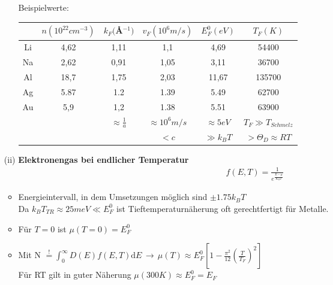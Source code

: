 \begin{itemize}
\begin{itemize}
         Beispielwerte:
         \begin{table}[H]
             \centering
             \begin{tabular}{c|ccccc}
                 & $ n (10^{22}cm^{-3}) $ & $k_F ($\AA$^{-1})$ & $v_F (10^6 m/s)$ & $E_F^0 (eV)$ & $T_F (K)$  \\ \hline
            Li  & 4,62 & 1,11 & 1,1  & 4,69  & 54400 \\
            Na  &2,62   &0,91   &1,05   &3,11   &36700\\
            Al  &18,7   &1,75   &2,03   &11,67  &135700\\
            Ag  &5.87   &1.2    &1.39   &5.49   &62700 \\
            Au  &5,9    &1,2    &  1.38  &   5.51    &  63900    \\
                &       &$\approx \frac{1}{a}$  & $\approx 10^6 m/s$    & $\approx 5 eV $   & $T_F \gg T_{Schmelz} $ \\
                &       &                       & $< c$                 & $\gg k_BT$         & $> \Theta_D \approx RT $
            \end{tabular}
         \end{table}
    \end{itemize}
    \item[(ii)] \textbf{Elektronengas bei endlicher Temperatur}
    \begin{align}
        f(E,T) = \frac{1}{e^{\frac{E-\mu}{K_B T}}}
    \end{align} 
    \begin{itemize}
        \item Energieintervall, in dem Umsetzungen möglich sind $\pm 1.75 k_B T$\\
            Da $k_B T_{TR} \approx 25 meV \ll E_F^0 $ ist Tieftemperaturnäherung oft gerechtfertigt für Metalle.
        \item Für $T=0$ ist $\mu(T=0) = E_F^0$ 
        \item Mit N $\overset{!}{=} \int_0^{\infty} D(E) f(E,T) \mathrm{d}E \, \rightarrow \, \mu(T) \approx E_F^0 \left[1-\frac{\pi^2}{12} \left(\frac{T}{T_F}\right)^2 \right]$\\
            Für RT gilt in guter Näherung $\mu(300K) \approx E_F^0 = E_F$
    \end{itemize}



\end{itemize}
